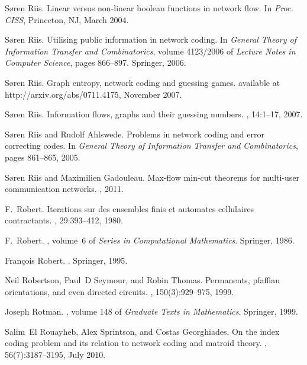 \documentclass[a4paper, 11pt]{book}
\numberwithin{equation}{section}
\theoremstyle{plain}
\renewcommand{\(}{\ldbrack}
\renewcommand{\)}{\rdbrack}
\begin{document}
\begin{thebibliography}{100}
S\o{}ren Riis.
\newblock Linear versus non-linear boolean functions in network flow.
\newblock In {\em Proc. CISS}, Princeton, NJ, March 2004.

S\o{}ren Riis.
\newblock Utilising public information in network coding.
\newblock In {\em General Theory of Information Transfer and Combinatorics},
  volume 4123/2006 of {\em Lecture Notes in Computer Science}, pages 866--897.
  Springer, 2006.

S\o{}ren Riis.
\newblock Graph entropy, network coding and guessing games.
\newblock available at http://arxiv.org/abs/0711.4175, November 2007.

S\o{}ren Riis.
\newblock Information flows, graphs and their guessing numbers.
, 14:1--17, 2007.

S\o{}ren Riis and Rudolf Ahlswede.
\newblock Problems in network coding and error correcting codes.
\newblock In {\em General Theory of Information Transfer and Combinatorics},
  pages 861--865, 2005.

S\o{}ren Riis and Maximilien Gadouleau.
\newblock Max-flow min-cut theorems for multi-user communication networks.
, 2011.

F.~Robert.
\newblock Iterations sur des ensembles finis et automates cellulaires
  contractants.
, 29:393--412, 1980.

F.~Robert.
, volume~6 of {\em Series in
  Computational Mathematics}.
\newblock Springer, 1986.

Fran\c{c}ois Robert.
.
\newblock Springer, 1995.

Neil Robertson, Paul~D Seymour, and Robin Thomas.
\newblock Permanents, pfaffian orientations, and even directed circuits.
, 150(3):929--975, 1999.

Joseph Rotman.
, volume 148 of {\em
  Graduate Texts in Mathematics}.
\newblock Springer, 1999.

Salim~El Rouayheb, Alex Sprintson, and Costas Georghiades.
\newblock On the index coding problem and its relation to network coding and
  matroid theory.
, 56(7):3187--3195, July
  2010.


\end{thebibliography}
\end{document}

